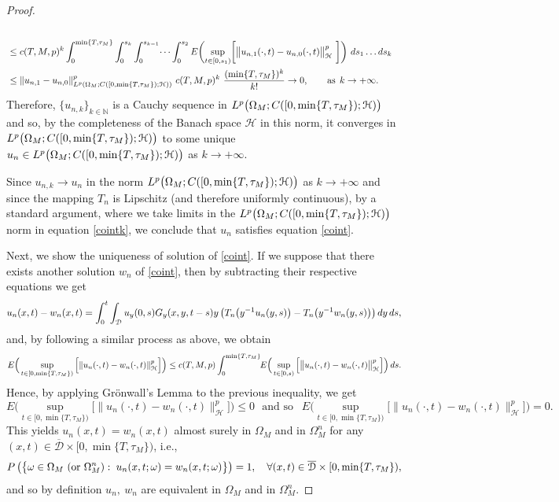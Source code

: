 \documentclass[reqno]{amsart}
\numberwithin{equation}{section}
\newcommand{\mN}{\mathbb{N}}
\newcommand{\Om}{\Omega}
\newcommand{\om}{\omega}
\newcommand{\ocd}{\overline{\mathcal{D}}}
\newcommand{\ch}{\mathcal{H}}
\begin{document}
\begin{proof}
\begin{align*}
\\
&\leq c(T,M,p)^k\int_0^{\min\{T,\tau_M\}}\int_0^{s_k}\int_{0}^{s_{k-1}}\dots\int_0^{s_2}
E\biggl{(}\underset{t\in[0,s_1)}{\text{sup}}\bigg{[}\big{\|}u_{n,1}(\cdot,t)-u_{n,0}(\cdot,t)\big{\|}_{\ch}^p\ \bigg{]}\biggr{)}\ ds_1\dots ds_k
\\
&\leq \|u_{n,1}-u_{n,0}\|^p_{L^p(\Om_M;C([0,\min\{T,\tau_M\});\ch))}\
c(T,M,p)^k\ \dfrac{(\min\{T,\tau_M\})^{k}}{k!}\rightarrow0,\qquad \text{as}\,\;k\to+\infty.%
\end{align*}
Therefore, $\{u_{n,k}\}_{k\in\mN}$ is a Cauchy sequence in $L^p\bigl{(}\Om_M;C([0,\min\{T,\tau_M\});\ch)\bigr{)}$ and so, by the completeness of the Banach space $\ch$ in this norm, it converges in $L^p\bigl{(}\Om_M;C([0,\min\{T,\tau_M\});\ch)\bigr{)}$ to some unique $u_n\in L^p\bigl{(}\Om_M;C([0,\min\{T,\tau_M\});\ch)\bigr{)}$ as $k\rightarrow+\infty$.

Since $u_{n,k}\rightarrow u_n$ in the norm $L^p\bigl{(}\Om_M;C([0,\min\{T,\tau_M\});\ch)\bigr{)}$ as
$k\rightarrow+\infty$ and since the mapping $T_n$ is Lipschitz (and therefore uniformly continuous), by a standard argument, where we take limits in the $L^{p}\bigl{(}\Om_M;C([0,\min\{T,\tau_M\});\ch)\bigr{)}$ norm in equation \eqref{cointk}, we conclude that $u_{n}$ satisfies equation
\eqref{coint}.

Next, we show the uniqueness of solution of \eqref{coint}. If we suppose that there exists another solution $ w_n $ of \eqref{coint}, then by subtracting their respective equations we get
$$u_n(x,t)-w_n(x,t)=\int_0^t\int_{\mathcal{D}}u_y(0,s) G_y(x,y,t-s) y \left(T_n\bigl{(}y^{-1}u_n(y,s)\bigr{)}-T_n\bigl{(}y^{-1}w_n(y,s)\bigr)\right) dy\,ds ,$$
and, by following a similar process as above, we obtain
$$E\Big(\sup_{t\in[0,\min\{T,\tau_M\})} \Big[\|u_n(\cdot,t)-w_n(\cdot,t)\|_{\ch}^p\Big]\Big)
\leq c(T,M,p) \int_0^{\min\{T,\tau_M\}}\hspace*{-0.1cm}E\Big(\sup_{t\in[0,s)}\Big[\big{\|}u_n(\cdot,t)-w_n(\cdot,t)\big{\|}_{\ch}^p\Big]\Big)\, ds.$$ Hence, by applying Gr\"onwall's Lemma to
the previous inequality, we get
$$E\Big(\sup_{t\in[0,\min\{T,\tau_M\})} \Big[\|u_n(\cdot,t)-w_n(\cdot,t)\|_{\ch}^p\Big]\Big)
\leq 0\ \ \ \text{and so }\ \
E\Big(\sup_{t\in[0,\min\{T,\tau_M\})} \Big[\|u_n(\cdot,t)-w_n(\cdot,t)\|_{\ch}^p
\Big]\Big) = 0.$$ This yields $u_n(x,t)=w_n(x,t)$
almost surely in $\Om_M$ and in $\Om_M^{n}$ for any
$(x,t)\in\ocd\times[0,\min\{T,\tau_M\})$, i.e.,
$$P\left(\big{\{}\om\in \Om_M\ (\text{or}\ \Om_M^n):\; u_n(x,t;\om)=w_n(x,t;\om)\big{\}}\right)=1,\quad \forall (x,t)\in\ocd\times[0,\min\{T,\tau_M\}),$$
and so by definition $u_n,\ w_n$ are equivalent in $\Om_M$
and in $\Om_M^n$.


\end{proof}
\end{document}

